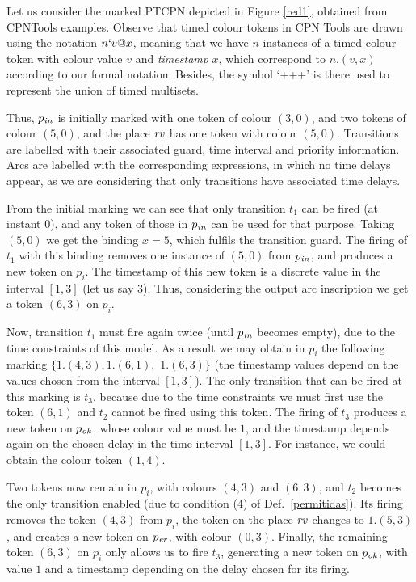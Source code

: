 \begin{example} Let us consider the marked PTCPN depicted in Figure \ref{red1}, 
obtained from CPNTools examples. 
% 
Observe that timed colour tokens in CPN Tools are drawn
using the notation $n`v@x$,
meaning that we have $n$ instances of a timed colour token 
with colour value $v$ and {\em timestamp} $x$, which correspond to $n.(v,x)$
according to our formal notation. Besides, the symbol `+++'
is there used to represent the union of timed
multisets. 

Thus, $p_{\it in}$ is initially marked with one token
of colour $(3,0)$, and two tokens of colour $(5,0)$,
and the place ${\it rv}$ has one token with colour
$(5,0)$.  Transitions are labelled
with their associated guard, time interval and priority
information. 
Arcs are labelled with the corresponding expressions,
in which no time delays appear, as we are considering
that only transitions have associated time delays.

From the initial marking we can see that
only transition $t_1$ can be fired (at instant $0$), and
any token of those in $p_{\it in}$ can be used for
that purpose.  Taking $(5,0)$ we get the binding $x=5$,
which fulfils the transition guard.
The firing of $t_1$ with this binding removes
one instance of $(5,0)$ from $p_{\it in}$,
and produces a new token on $p_i$.
The timestamp of this new token is a discrete value
in the interval $[1,3]$ (let us say $3$).
Thus, considering the output
arc inscription we get a token $(6,3)$  on $p_i$.

Now, transition $t_1$ must fire again twice (until $p_{\it in}$ 
becomes empty), due to the time constraints of this model. 
As a result we may obtain in $p_i$ the following marking
$\{1.(4,3), 1.(6,1),$
$ 1.(6,3)\}$ (the timestamp values depend on the values
chosen from the interval $[1,3]$).
% 
The only transition that can be fired at this marking
is $t_3$, because due to the time constraints 
we must first use the token $(6,1)$
and $t_2$ cannot be fired using this token.
The firing of $t_3$ produces a new token on $p_{\it ok}$,
whose colour value must be $1$, and the timestamp
depends again on the chosen delay in the time interval
$[1,3]$. For instance, we could obtain the 
colour token $(1,4)$. 

Two tokens now remain in $p_i$, with colours  $(4,3)$ and 
$(6,3)$, and $t_2$ becomes the only transition
enabled (due to condition (4) of Def.\ \ref{permitidas}).
Its firing removes the token $(4,3)$ from $p_i$,
the token on the place ${\it rv}$ changes to $1.(5,3)$,  
and creates a new token on $p_{\it er}$, with colour $(0,3)$. 
%
% 
Finally, the remaining token $(6,3)$ on $p_i$ 
only allows us to fire $t_3$, generating a new token
on $p_{\it ok}$, with value $1$ and a timestamp
depending on the delay chosen for its firing.
\end{example}


